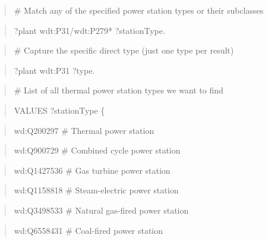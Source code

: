 \documentclass[a4paper,11pt]{report}
\begin{document}
\begin{quote}
\end{quote}

\begin{quote}
\# Match any of the specified power station types or their subclasses
\end{quote}

\begin{quote}
?plant wdt:P31/wdt:P279* ?stationType.
\end{quote}

\begin{quote}
\end{quote}

\begin{quote}
\# Capture the specific direct type (just one type per result)
\end{quote}

\begin{quote}
?plant wdt:P31 ?type.
\end{quote}

\begin{quote}
\end{quote}

\begin{quote}
\# List of all thermal power station types we want to find
\end{quote}

\begin{quote}
VALUES ?stationType \{
\end{quote}

\begin{quote}
wd:Q200297 \# Thermal power station
\end{quote}

\begin{quote}
wd:Q900729 \# Combined cycle power station
\end{quote}

\begin{quote}
wd:Q1427536 \# Gas turbine power station
\end{quote}

\begin{quote}
wd:Q1158818 \# Steam-electric power station
\end{quote}

\begin{quote}
wd:Q3498533 \# Natural gas-fired power station
\end{quote}

\begin{quote}
wd:Q6558431 \# Coal-fired power station
\end{quote}
\end{document}
